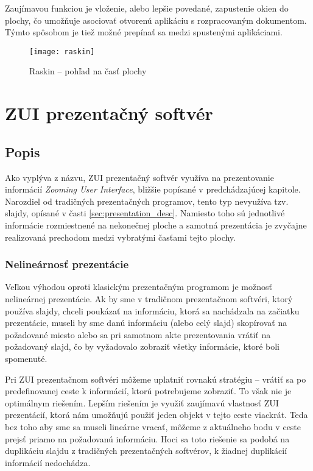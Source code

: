 Zaujímavou funkciou je vloženie, alebo lepšie povedané, zapustenie okien do plochy, čo umožňuje asociovať otvorenú aplikáciu s rozpracovaným dokumentom. Týmto spôsobom je tiež možné prepínať sa medzi spustenými aplikáciami.

\begin{figure}[hb]
 \centering
 \texttt{[image: raskin]}
 \caption{Raskin -- pohľad na časť plochy\label{fig:raskin}}
\end{figure}

\chapter{ZUI prezentačný softvér} \label{ch:zui_prezentacny_softver}

\section{Popis} \label{sec:zui-prezentation}

Ako vyplýva z názvu, ZUI prezentačný softvér využíva na prezentovanie informácií \textit{Zooming User Interface}, bližšie popísané v predchádzajúcej kapitole. Narozdiel od tradičných prezentačných programov, tento typ nevyužíva tzv. slajdy, opísané v časti \ref{sec:presentation_desc}. Namiesto toho sú jednotlivé informácie rozmiestnené na nekonečnej ploche a samotná prezentácia je zvyčajne realizovaná prechodom medzi vybratými časťami tejto plochy.

\subsection{Nelineárnosť prezentácie}

Veľkou výhodou oproti klasickým prezentačným programom je možnosť nelineárnej prezentácie. Ak by sme v tradičnom prezentačnom softvéri, ktorý používa slajdy, chceli poukázať na informáciu, ktorá sa nachádzala na začiatku prezentácie, museli by sme danú informáciu (alebo celý slajd) skopírovať na požadované miesto alebo sa pri samotnom akte prezentovania vrátiť na požadovaný slajd, čo by vyžadovalo zobraziť všetky informácie, ktoré boli spomenuté.

Pri ZUI prezentačnom softvéri môžeme uplatniť rovnakú stratégiu -- vrátiť sa po predefinovanej ceste k informácií, ktorú potrebujeme zobraziť. To však nie je optimálnym riešením. Lepším riešením je využiť zaujímavú vlastnosť ZUI prezentácií, ktorá nám umožňujú použiť jeden objekt v tejto ceste viackrát. Teda bez toho aby sme sa museli lineárne vracať, môžeme z aktuálneho bodu v ceste prejsť priamo na požadovanú informáciu. Hoci sa toto riešenie sa podobá na duplikáciu slajdu z tradičných prezentačných softvérov, k žiadnej duplikácií informácií nedochádza.

